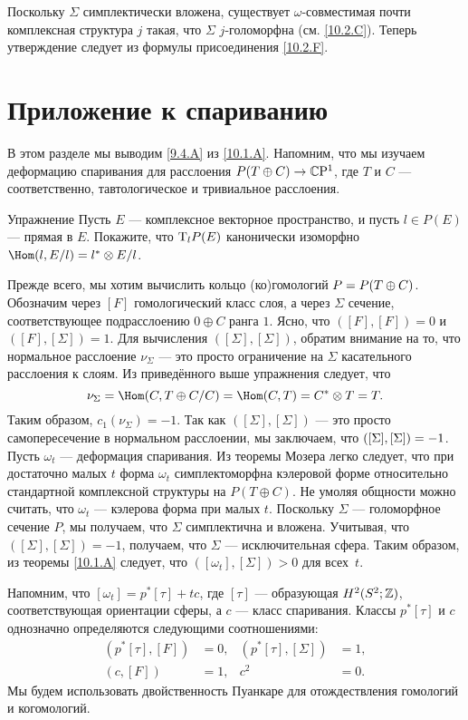 Поскольку $\Sigma$ симплектически вложена, существует
$\omega$-совместимая почти комплексная структура $j$ такая, что
$\Sigma$ $j$-голоморфна (см. \ref{10.2.C}). 
Теперь утверждение следует из формулы присоединения \ref{10.2.F}. 
\qeds


\section{Приложение к спариванию}\label{sec:10.3}

В этом разделе мы выводим \ref{9.4.A} из \ref{10.1.A}.
Напомним, что мы изучаем деформацию спаривания для расслоения $P(T
\oplus C) \to \mathbb{C}\mathrm{P}^1$, где $T$ и $C$ — соответственно,
тавтологическое и тривиальное расслоения. 

\begin{ex*}{Упражнение}
Пусть $E$ — комплексное векторное пространство, и пусть $l \in P(E)$
— прямая в $E$. 
Покажите, что $\mathrm{T}_l P(E)$ канонически изоморфно $\Hom(l, E/l) = l^\ast \otimes E/l$.
\end{ex*}

Прежде всего, мы хотим вычислить кольцо (ко)гомологий $P \z= P(T \oplus C)$.
Обозначим через $[F]$ гомологический класс слоя, а через $\Sigma$
сечение, соответствующее подрасслоению $0\oplus C$ ранга $1$. 
Ясно, что $([F], [F]) = 0$ и $([F], [\Sigma]) = 1$.
Для вычисления $([\Sigma], [\Sigma])$, обратим внимание на то, что
нормальное расслоение $\nu_\Sigma$ — это просто ограничение на
$\Sigma$ касательного расслоения к слоям. 
Из приведённого выше упражнения следует, что 
\[\nu_\Sigma = \Hom(C, T \oplus C/C) = \Hom(C, T) = C^\ast \otimes T = T.\]
Таким образом, $c_1 (\nu_\Sigma) = -1$. 
Так как $([\Sigma], [\Sigma])$ — это просто самопересечение в нормальном расслоении,
мы заключаем, что $([\Sigma], [\Sigma]) \z= -1$.
Пусть $\omega_t$ — деформация спаривания.
Из теоремы Мозера \cite{MS} легко следует, что при достаточно малых
$t$ форма $\omega_t$ симплектоморфна кэлеровой форме относительно
стандартной комплексной структуры на $P(T \oplus C)$. 
Не умоляя общности можно считать, что $\omega_t$ — кэлерова
форма при малых $t$. 
Поскольку $\Sigma$ — голоморфное сечение $P$, мы получаем, что
$\Sigma$ симплектична и вложена. 
Учитывая, что $([\Sigma], [\Sigma]) = -1$, получаем, что $\Sigma$ —
исключительная сфера. 
Таким образом, из теоремы \ref{10.1.A} следует, что $([\omega_t],
[\Sigma]) > 0$ для всех~$t$. 

Напомним, что $[\omega_t] = p^\ast [\tau] + tc$, где $[\tau]$ —
образующая $H^2 (S^2;\mathbb{Z})$, соответствующая ориентации сферы, а $c$ — класс спаривания.  
Классы $p^\ast [\tau]$ и $c$ однозначно определяются следующими соотношениями: 
\begin{align*}
(p^\ast [\tau], [F]) &= 0,
&
(p^\ast [\tau], [\Sigma]) &= 1,
\\
(c, [F]) &= 1,
&
c^2 &= 0.
\end{align*}
Мы будем использовать двойственность Пуанкаре для отождествления гомологий и когомологий.

